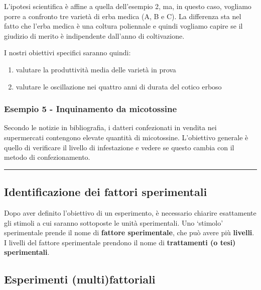 \documentclass[a4paper,12pt,oneside]{book}
\providecommand{\tightlist}{%
  \setlength{\itemsep}{0pt}\setlength{\parskip}{0pt}}
\begin{document}
L'ipotesi scientifica è affine a quella dell'esempio 2, ma, in questo
caso, vogliamo porre a confronto tre varietà di erba medica (A, B e C).
La differenza sta nel fatto che l'erba medica è una coltura poliennale e
quindi vogliamo capire se il giudizio di merito è indipendente dall'anno
di coltivazione.

I nostri obiettivi specifici saranno quindi:

\begin{enumerate}
\def\labelenumi{\arabic{enumi}.}
\tightlist
\item
  valutare la produttività media delle varietà in prova
\item
  valutare le oscillazione nei quattro anni di durata del cotico erboso
\end{enumerate}

\subsubsection{Esempio 5 - Inquinamento da
micotossine}\label{esempio-5---inquinamento-da-micotossine}

Secondo le notizie in bibliografia, i datteri confezionati in vendita
nei supermercati contengono elevate quantità di micotossine. L'obiettivo
generale è quello di verificare il livello di infestazione e vedere se
questo cambia con il metodo di confezionamento.

\begin{center}\rule{0.5\linewidth}{\linethickness}\end{center}

\subsection{Identificazione dei fattori
sperimentali}\label{identificazione-dei-fattori-sperimentali}

Dopo aver definito l'obiettivo di un esperimento, è necessario chiarire
esattamente gli stimoli a cui saranno sottoposte le unità sperimentali.
Uno `stimolo' sperimentale prende il nome di \textbf{fattore
sperimentale}, che può avere più \textbf{livelli}. I livelli del fattore
sperimentale prendono il nome di \textbf{trattamenti (o tesi)
sperimentali}.

\subsection{Esperimenti
(multi)fattoriali}\label{esperimenti-multifattoriali}
\end{document}
